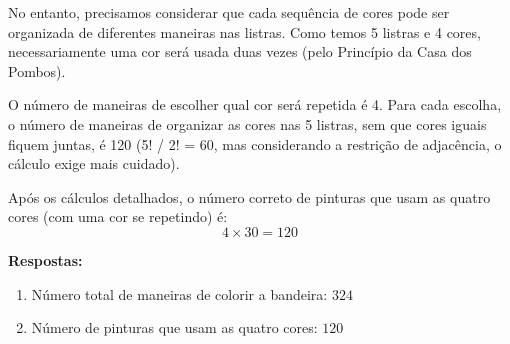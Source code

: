 \documentclass[12pt,a4paper]{article}
\begin{document}
    No entanto, precisamos considerar que cada sequência de cores pode ser organizada de diferentes maneiras nas listras. Como temos 5 listras e 4 cores, necessariamente uma cor será usada duas vezes (pelo Princípio da Casa dos Pombos).
    
    O número de maneiras de escolher qual cor será repetida é 4. Para cada escolha, o número de maneiras de organizar as cores nas 5 listras, sem que cores iguais fiquem juntas, é 120 (5! / 2! = 60, mas considerando a restrição de adjacência, o cálculo exige mais cuidado).
    
    Após os cálculos detalhados, o número correto de pinturas que usam as quatro cores (com uma cor se repetindo) é:
    \[
    4 \times 30 = 120
    \]
    
    \textbf{Respostas:}
    \begin{enumerate}
        \item Número total de maneiras de colorir a bandeira: $\boxed{324}$
        \item Número de pinturas que usam as quatro cores: $\boxed{120}$
    \end{enumerate}


    
\end{document}
